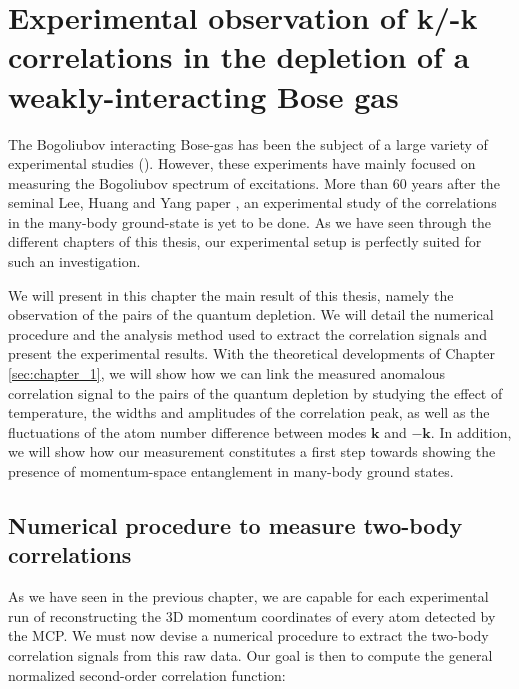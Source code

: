 
\chapter{Experimental observation of k/-k correlations in the depletion of a weakly-interacting Bose gas}

\label{sec:chapter_4}

The Bogoliubov interacting Bose-gas has been the subject of a large variety of experimental studies (\cite{fontaine2018,miller1962,ozeri2005,stepanov2019}). However, these experiments have mainly focused on measuring the Bogoliubov spectrum of excitations. More than 60 years after the seminal Lee, Huang and Yang paper \cite{lee1957}, an experimental study of the correlations in the many-body ground-state is yet to be done. As we have seen through the different chapters of this thesis, our experimental setup is perfectly suited for such an investigation. 

We will present in this chapter the main result of this thesis, namely the observation of the \kmk pairs of the quantum depletion. We will detail the numerical procedure and the analysis method used to extract the correlation signals and present the experimental results. With the theoretical developments of Chapter \ref{sec:chapter_1}, we will show how we can link the measured anomalous correlation signal to the \kmk pairs of the quantum depletion by studying the effect of temperature, the widths and amplitudes of the correlation peak, as well as the fluctuations of the atom number difference between modes $\bm{k}$ and $-\bm{k}$. In addition, we will show how our measurement constitutes a first step towards showing the presence of momentum-space entanglement in many-body ground states.

\section{Numerical procedure to measure two-body correlations}

\label{sec:numerical_calculation}

As we have seen in the previous chapter, we are capable for each experimental run of reconstructing the 3D momentum coordinates of every atom detected by the MCP. We must now devise a numerical procedure to extract the two-body correlation signals from this raw data. Our goal is then to compute the general normalized second-order correlation function:

